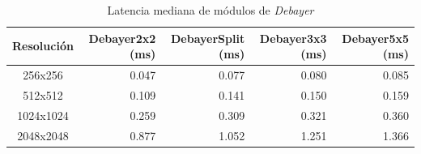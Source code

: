 \begin{table}[htbp]
\centering
\renewcommand{\arraystretch}{1.2}
\setlength{\tabcolsep}{6pt}
\begin{tabular}{|c|r|r|r|r|}
\hline
\rowcolor[gray]{0.90}
\textbf{Resolución} & \textbf{Debayer2x2 (ms)} & \textbf{DebayerSplit (ms)} & \textbf{Debayer3x3 (ms)} & \textbf{Debayer5x5 (ms)} \\
\hline
256x256 & 0.047 & 0.077 & 0.080 & 0.085 \\
\hline
512x512 & 0.109 & 0.141 & 0.150 & 0.159 \\
\hline
1024x1024 & 0.259 & 0.309 & 0.321 & 0.360 \\
\hline
2048x2048 & 0.877 & 1.052 & 1.251 & 1.366 \\
\hline
\end{tabular}
\caption{Latencia mediana de módulos de \textit{Debayer}}
\label{tab:debayer_gpu_latency_equipo1_float32}
\end{table}
